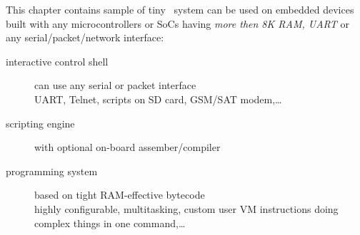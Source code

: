 \clearpage{}\secdown\label{micro}

This chapter contains sample of tiny \F\ system can be used on embedded
devices built with any microcontrollers or SoCs having \emph{more then 8K RAM,
UART} or any serial/packet/network interface:
\begin{description}
\item[interactive control shell] can use any serial or packet interface\\
UART, Telnet, scripts on SD card, GSM/SAT modem,\ldots
\item[scripting engine] with optional on-board assember/compiler
\item[programming system] based on tight RAM-effective bytecode\\
highly configurable, multitasking, custom user VM instructions doing complex
things in one command,\ldots
\end{description}






\secup
